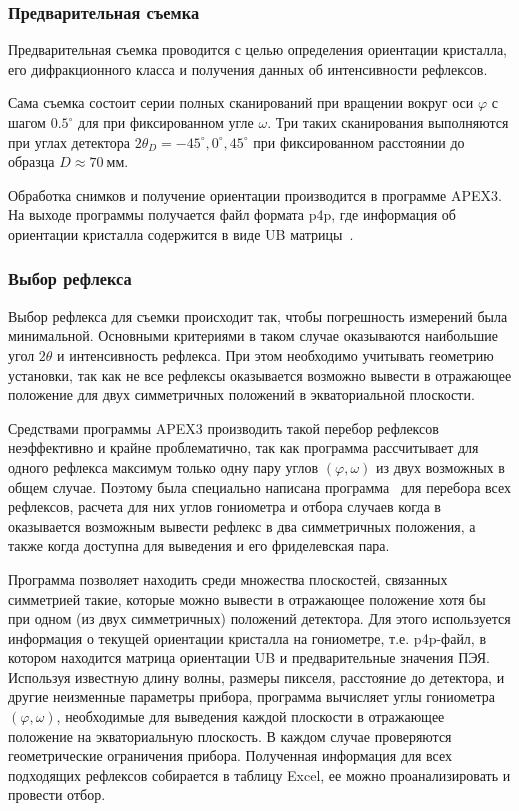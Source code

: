 \documentclass[a4paper,14pt]{extarticle}
\newcommand{\unit}[1]{ \ \text{#1}}
\newcommand{\degree}{^\circ}
\begin{document}
\subsubsection{Предварительная съемка}
Предварительная съемка проводится с целью определения ориентации кристалла, его дифракционного класса и получения данных об интенсивности рефлексов.

Сама съемка состоит серии полных сканирований при вращении вокруг оси $\varphi$ с шагом $0.5\degree$ для при фиксированном угле $\omega$.
Три таких сканирования выполняются при углах детектора $2\theta_D = -45\degree, 0\degree, 45\degree$ при фиксированном расстоянии до образца $D \approx 70\unit{мм}$.

Обработка снимков и получение ориентации производится в программе APEX3.
На выходе программы получается файл формата p4p, где информация об ориентации кристалла содержится в виде UB матрицы~\cite{Busing:1967}.
\subsubsection{Выбор рефлекса}
Выбор рефлекса для съемки происходит так, чтобы погрешность измерений была минимальной.
Основными критериями в таком случае оказываются наибольшие угол $2\theta$ и интенсивность рефлекса.
При этом необходимо учитывать геометрию установки, так как не все рефлексы оказывается возможно вывести в отражающее положение для двух симметричных положений в экваториальной плоскости.

Средствами программы APEX3 производить такой перебор рефлексов неэффективно и крайне проблематично, так как программа рассчитывает для одного рефлекса максимум только одну пару углов $(\varphi, \omega)$ из двух возможных в общем случае.
Поэтому была специально написана программа~\cite{Kudryavtsev:2024:eccentr} для перебора всех рефлексов, расчета для них углов гониометра и отбора случаев когда в оказывается возможным вывести рефлекс в два симметричных положения, а также когда доступна для выведения и его фриделевская пара.

Программа позволяет находить среди множества плоскостей, связанных симметрией такие, которые можно вывести в отражающее положение хотя бы при одном (из двух симметричных) положений детектора.
Для этого используется информация о текущей ориентации кристалла на гониометре, т.е. p4p-файл, в котором находится матрица ориентации UB и предварительные значения ПЭЯ.
Используя известную длину волны, размеры пикселя, расстояние до детектора, и другие неизменные параметры прибора, программа вычисляет углы гониометра $(\varphi, \omega)$, необходимые для выведения каждой плоскости в отражающее положение на экваториальную плоскость.
В каждом случае проверяются геометрические ограничения прибора.
Полученная информация для всех подходящих рефлексов собирается в таблицу Excel, ее можно проанализировать и провести отбор.
\end{document}
